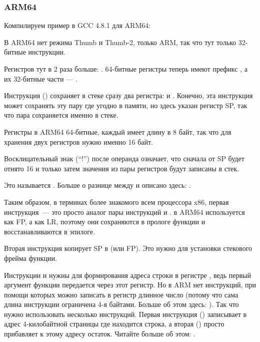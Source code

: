 \subsubsection{ARM64}


Компилируем пример в GCC 4.8.1 для ARM64:



В ARM64 нет режима Thumb и Thumb-2, только ARM, так что тут только 32-битные инструкции.

Регистров тут в 2 раза больше: .
64-битные регистры теперь имеют префикс 
, а их 32-битные части --- .

Инструкция  () 
сохраняет в стеке сразу два регистра:  и .
Конечно, эта инструкция может сохранять эту пару где угодно в памяти, но здесь указан регистр \ac{SP}, так что
пара сохраняется именно в стеке.

Регистры в ARM64 64-битные, каждый имеет длину в 8 байт, так что для хранения двух регистров нужно именно 16 байт.

Восклицательный знак (``!'') после операнда означает, что сначала от \ac{SP} будет отнято 16 и только затем
значения из пары регистров будут записаны в стек.

Это называется .
Больше о разнице между  и  
описано здесь: .

Таким образом, в терминах более знакомого всем процессора x86, первая инструкция~--- это просто аналог 
пары инструкций  и .
 в ARM64 используется как \ac{FP}, а  
как \ac{LR}, поэтому они сохраняются в прологе функции и
восстанавливаются в эпилоге.

Вторая инструкция копирует \ac{SP} в  (или \ac{FP}).
Это нужно для установки стекового фрейма функции.

\label{pointers_ADRP_and_ADD}
Инструкции  и \ADD нужны для формирования адреса строки  в регистре , 
ведь первый аргумент функции передается через этот регистр.
Но в ARM нет инструкций, при помощи которых можно записать в регистр длинное число 
(потому что сама длина инструкции ограничена 4-я байтами. Больше об этом здесь: ).
Так что нужно использовать несколько инструкций.
Первая инструкция () записывает в  адрес 4-килобайтной страницы где находится строка, 
а вторая (\ADD) просто прибавляет к этому адресу остаток.
Читайте больше об этом: .

